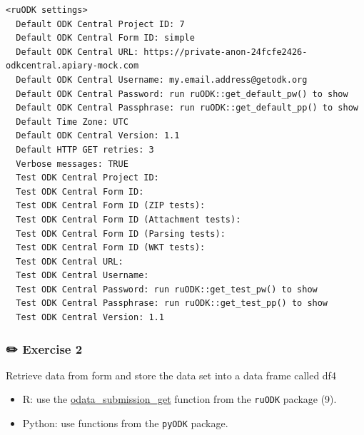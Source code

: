 \documentclass[
  letterpaper,
  DIV=11,
  numbers=noendperiod]{scrreprt}
\providecommand{\tightlist}{%
  \setlength{\itemsep}{0pt}\setlength{\parskip}{0pt}}\usepackage{longtable,booktabs,array}
\begin{document}
\begin{verbatim}
<ruODK settings>
  Default ODK Central Project ID: 7 
  Default ODK Central Form ID: simple 
  Default ODK Central URL: https://private-anon-24fcfe2426-odkcentral.apiary-mock.com 
  Default ODK Central Username: my.email.address@getodk.org 
  Default ODK Central Password: run ruODK::get_default_pw() to show 
  Default ODK Central Passphrase: run ruODK::get_default_pp() to show 
  Default Time Zone: UTC 
  Default ODK Central Version: 1.1 
  Default HTTP GET retries: 3 
  Verbose messages: TRUE 
  Test ODK Central Project ID:  
  Test ODK Central Form ID:  
  Test ODK Central Form ID (ZIP tests):  
  Test ODK Central Form ID (Attachment tests):  
  Test ODK Central Form ID (Parsing tests):  
  Test ODK Central Form ID (WKT tests):  
  Test ODK Central URL:  
  Test ODK Central Username:  
  Test ODK Central Password: run ruODK::get_test_pw() to show 
  Test ODK Central Passphrase: run ruODK::get_test_pp() to show 
  Test ODK Central Version: 1.1 
\end{verbatim}

\hypertarget{exercise-2-1}{%
\subsubsection{\texorpdfstring{{✏️} Exercise
2}{✏️ Exercise 2}}\label{exercise-2-1}}

Retrieve data from form and store the data set into a data frame called
df4

\begin{tcolorbox}[enhanced jigsaw, colframe=quarto-callout-tip-color-frame, colback=white, rightrule=.15mm, bottomrule=.15mm, left=2mm, arc=.35mm, coltitle=black, title=\textcolor{quarto-callout-tip-color}{\faLightbulb}\hspace{0.5em}{Tip}, opacitybacktitle=0.6, bottomtitle=1mm, opacityback=0, toptitle=1mm, toprule=.15mm, colbacktitle=quarto-callout-tip-color!10!white, titlerule=0mm, leftrule=.75mm, breakable]

\begin{itemize}
\tightlist
\item
  R: use the
  \href{https://docs.ropensci.org/ruODK/reference/odata_submission_get.html}{odata\_submission\_get}
  function from the \texttt{ruODK} package (9).
\item
  Python: use functions from the \texttt{pyODK} package.
\end{itemize}

\end{tcolorbox}
\end{document}
